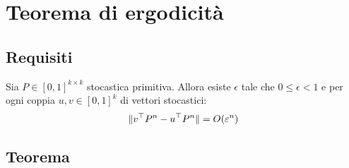 %
%
%
%


\section{Teorema di ergodicità}


\subsection{Requisiti}
\begin{prop}\label{prop:stocconv}
	Sia $P\in[0,1]^{k\times k}$ stocastica primitiva. Allora esiste $\epsilon$ tale che $0\le\epsilon<1$ e per ogni coppia $u,v\in[0,1]^k$ di vettori stocastici:
	\begin{equation*}
		\|v^\top P^n-u^\top P^n\| = O(\varepsilon^n)
	\end{equation*}
\end{prop}


\subsection{Teorema}

